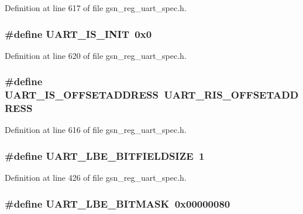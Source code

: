 Definition at line 617 of file gsn\_\-reg\_\-uart\_\-spec.h.

\hypertarget{a00575_a57b3b2a3b442cafa19c0707e3afca72b}{
\subsubsection[{UART\_\-IS\_\-INIT}]{\setlength{\rightskip}{0pt plus 5cm}\#define UART\_\-IS\_\-INIT~0x0}}
\label{a00575_a57b3b2a3b442cafa19c0707e3afca72b}


Definition at line 620 of file gsn\_\-reg\_\-uart\_\-spec.h.

\hypertarget{a00575_a5a0bfdc6053f52ed9a111d238eb1002b}{
\subsubsection[{UART\_\-IS\_\-OFFSETADDRESS}]{\setlength{\rightskip}{0pt plus 5cm}\#define UART\_\-IS\_\-OFFSETADDRESS~UART\_\-RIS\_\-OFFSETADDRESS}}
\label{a00575_a5a0bfdc6053f52ed9a111d238eb1002b}


Definition at line 616 of file gsn\_\-reg\_\-uart\_\-spec.h.

\hypertarget{a00575_ac57fd32b382e46ba721cafd18c8b95cb}{
\subsubsection[{UART\_\-LBE\_\-BITFIELDSIZE}]{\setlength{\rightskip}{0pt plus 5cm}\#define UART\_\-LBE\_\-BITFIELDSIZE~1}}
\label{a00575_ac57fd32b382e46ba721cafd18c8b95cb}


Definition at line 426 of file gsn\_\-reg\_\-uart\_\-spec.h.

\hypertarget{a00575_a4e6f79be4c150fd0f150b70096f4131a}{
\subsubsection[{UART\_\-LBE\_\-BITMASK}]{\setlength{\rightskip}{0pt plus 5cm}\#define UART\_\-LBE\_\-BITMASK~0x00000080}}
\label{a00575_a4e6f79be4c150fd0f150b70096f4131a}


